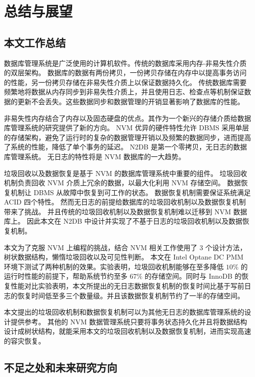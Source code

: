 
\chapter{总结与展望}

\section{本文工作总结}


数据库管理系统是广泛使用的计算机软件。传统的数据库采用内存-非易失性介质的双层架构。
数据库的数据有两份拷贝，一份拷贝存储在内存中以提高事务访问的性能，另一份拷贝存储在非易失性介质上以保证数据持久化。
传统数据库需要频繁地将数据从内存同步到非易失性介质上，并且使用日志、检查点等机制保证数据的更新不会丢失。这些数据同步和数据管理的开销显著影响了数据库的性能。

非易失性内存结合了内存以及固态硬盘的优点。其作为一个新兴的存储介质给数据库管理系统的研究提供了新的方向。
NVM 优异的硬件特性允许 DBMS 采用单层的存储架构，避免了运行时的复杂的数据管理开销以及频繁的数据同步，进而提高了系统的性能，降低了单个事务的延迟。
N2DB 是第一个零拷贝，无日志的数据库管理系统。
无日志的特性将是 NVM 数据库的一大趋势。

垃圾回收以及数据恢复是基于 NVM 的数据库管理系统中重要的组件。
垃圾回收机制负责回收 NVM 介质上冗余的数据，以最大化利用 NVM 存储空间。
数据恢复机制让 DBMS 从故障中恢复到可工作的状态。
数据恢复机制需要保证系统满足 ACID 四个特性。
然而无日志的前提给数据库的垃圾回收机制以及数据恢复机制带来了挑战。
并且传统的垃圾回收机制以及数据恢复机制难以迁移到 NVM 数据库上。
因此本文在 N2DB 中设计并实现了不基于日志的垃圾回收机制以及数据恢复机制。

本文为了克服 NVM 上编程的挑战，结合 NVM 相关工作使用了 3 个设计方法，树状数据结构，懒惰垃圾回收以及可见性判断。
本文在 Intel Optane DC PMM 环境下测试了两种机制的效果。实验表明，垃圾回收机制能够在至多降低 $10\%$ 的运行时性能的前提下，帮助系统节约至多 $67\%$ 的存储空间。同时与 InnoDB 的恢复性能对比实验表明，本文所提出的无日志数据恢复机制的恢复时间比基于写前日志的恢复时间低至多三个数量级。并且该数据恢复机制节约了一半的存储空间。

本文提出的垃圾回收机制和数据恢复机制可以为其他无日志的数据库管理系统的设计提供参考。
其他的 NVM 数据管理系统只要将事务状态持久化并且将数据结构设计成树状结构，就能采用本文的垃圾回收机制以及数据恢复机制，进而实现高速的容灾恢复。


\section{不足之处和未来研究方向}

